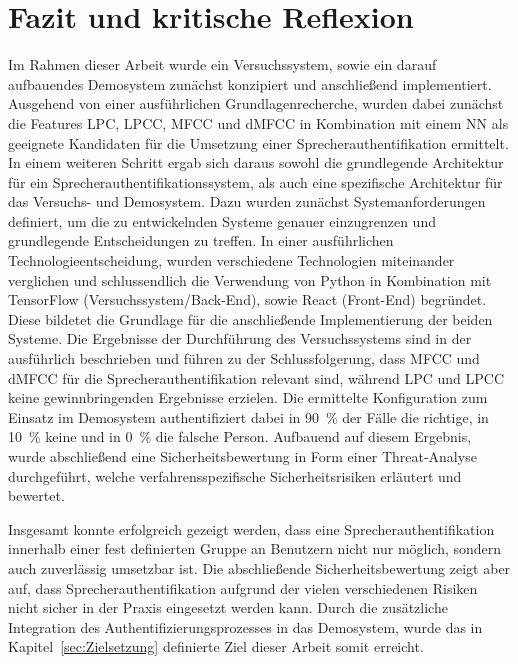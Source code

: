 \section{Fazit und kritische Reflexion}

\textauthor{\vHS}{}{}

Im Rahmen dieser Arbeit wurde ein Versuchssystem, sowie ein darauf aufbauendes Demosystem zunächst konzipiert und anschließend implementiert.
Ausgehend von einer ausführlichen Grundlagenrecherche, wurden dabei zunächst die Features \ac{LPC}, \ac{LPCC}, \ac{MFCC} und \ac{dMFCC} in Kombination mit einem \ac{NN} als geeignete Kandidaten für die Umsetzung einer Sprecherauthentifikation ermittelt.
In einem weiteren Schritt ergab sich daraus sowohl die grundlegende Architektur für ein Sprecherauthentifikationssystem, als auch eine spezifische Architektur für das Versuchs- und Demosystem.
Dazu wurden zunächst Systemanforderungen definiert, um die zu entwickelnden Systeme genauer einzugrenzen und grundlegende Entscheidungen zu treffen.
In einer ausführlichen Technologieentscheidung, wurden verschiedene Technologien miteinander verglichen und schlussendlich die Verwendung von Python in Kombination mit TensorFlow (Versuchssystem/Back-End), sowie React (Front-End) begründet.
Diese bildetet die Grundlage für die anschließende Implementierung der beiden Systeme.
Die Ergebnisse der Durchführung des Versuchssystems sind in der  ausführlich beschrieben und führen zu der Schlussfolgerung, dass \ac{MFCC} und \ac{dMFCC} für die Sprecherauthentifikation relevant sind, während \ac{LPC} und \ac{LPCC} keine gewinnbringenden Ergebnisse erzielen.
Die ermittelte Konfiguration zum Einsatz im Demosystem authentifiziert dabei in 90~\% der Fälle die richtige, in 10~\% keine und in 0~\% die falsche Person.
Aufbauend auf diesem Ergebnis, wurde abschließend eine Sicherheitsbewertung in Form einer Threat-Analyse durchgeführt, welche verfahrensspezifische Sicherheitsrisiken erläutert und bewertet.

Insgesamt konnte erfolgreich gezeigt werden, dass eine Sprecherauthentifikation innerhalb einer fest definierten Gruppe an Benutzern nicht nur möglich, sondern auch zuverlässig umsetzbar ist.
Die abschließende Sicherheitsbewertung zeigt aber auf, dass Sprecherauthentifikation aufgrund der vielen verschiedenen Risiken nicht sicher in der Praxis eingesetzt werden kann.
Durch die zusätzliche Integration des Authentifizierungsprozesses in das Demosystem, wurde das in Kapitel~\ref{sec:Zielsetzung} definierte Ziel dieser Arbeit somit erreicht.

